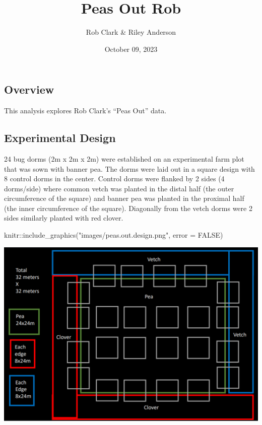 \documentclass[
]{article}
\title{Peas Out Rob}
\author{Rob Clark \& Riley Anderson}
\date{October 09, 2023}
\newenvironment{Shaded}{\begin{snugshade}}{\end{snugshade}}
\newcommand{\AttributeTok}[1]{\textcolor[rgb]{0.77,0.63,0.00}{#1}}
\newcommand{\ConstantTok}[1]{\textcolor[rgb]{0.00,0.00,0.00}{#1}}
\newcommand{\FunctionTok}[1]{\textcolor[rgb]{0.00,0.00,0.00}{#1}}
\newcommand{\NormalTok}[1]{#1}
\newcommand{\SpecialCharTok}[1]{\textcolor[rgb]{0.00,0.00,0.00}{#1}}
\newcommand{\StringTok}[1]{\textcolor[rgb]{0.31,0.60,0.02}{#1}}
\begin{document}
\maketitle

{
\setcounter{tocdepth}{2}
\tableofcontents
}
\hypertarget{overview}{%
\subsection{Overview}\label{overview}}

This analysis explores Rob Clark's ``Peas Out'' data.

\hypertarget{experimental-design}{%
\subsection{Experimental Design}\label{experimental-design}}

24 bug dorms (2m x 2m x 2m) were established on an experimental farm
plot that was sown with banner pea. The dorms were laid out in a square
design with 8 control dorms in the center. Control dorms were flanked by
2 sides (4 dorms/side) where common vetch was planted in the distal half
(the outer circumference of the square) and banner pea was planted in
the proximal half (the inner circumference of the square). Diagonally
from the vetch dorms were 2 sides similarly planted with red clover.

\begin{Shaded}
\begin{Highlighting}[]

\NormalTok{knitr}\SpecialCharTok{::}\FunctionTok{include\_graphics}\NormalTok{(}\StringTok{"images/peas.out.design.png"}\NormalTok{, }\AttributeTok{error =} \ConstantTok{FALSE}\NormalTok{)}
\end{Highlighting}
\end{Shaded}

\includegraphics{images/peas.out.design.png}
\end{document}
